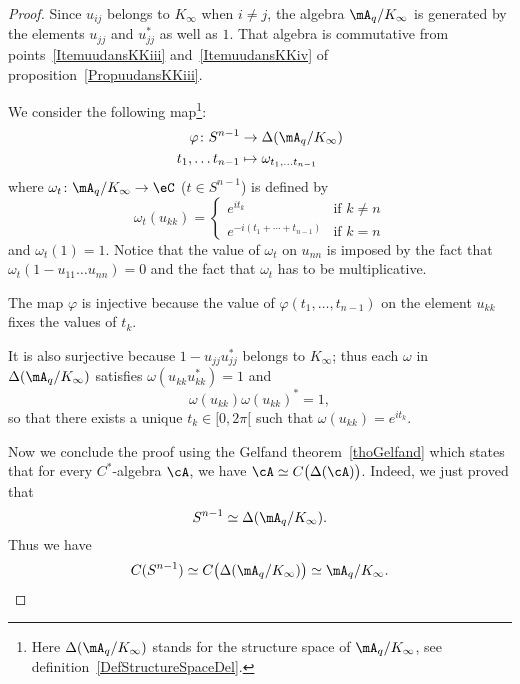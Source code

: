 \begin{proof}
	Since $u_{ij}$ belongs to $K_{\infty}$ when $i\neq j$, the algebra $\mA_q/K_{\infty}$ is generated by the elements $u_{jj}$ and $u_{jj}^*$ as well as $1$. That algebra is commutative from points~\ref{ItemuudansKKiii} and~\ref{ItemuudansKKiv} of proposition~\ref{PropuudansKKiii}.

	We consider the following map\footnote{Here $\Delta(\mA_q/K_{\infty})$ stands for the structure space of $\mA_q/K_{\infty}$, see definition~\ref{DefStructureSpaceDel}.}:
	\begin{equation}
		\begin{aligned}
			\varphi\colon S^{n-1} & \to \Delta(\mA_q/K_{\infty})        \\
			t_1,\ldots t_{n-1}    & \mapsto \omega_{t_1,\ldots t_{n-1}}
		\end{aligned}
	\end{equation}
	where $\omega_t\colon \mA_q/K_{\infty}\to \eC$ ($t\in S^{n-1}$) is defined by
	\begin{equation}
		\omega_t(u_{kk})=\begin{cases}
			e^{it_k}                   & \text{if }k\neq n \\
			e^{-i(t_1+\cdots+t_{n-1})} & \text{if }k=n
		\end{cases}
	\end{equation}
	and $\omega_t(1)=1$. Notice that the value of $\omega_t$ on $u_{nn}$ is imposed by the fact that $\omega_t(1-u_{11}\ldots u_{nn})=0$ and the fact that $\omega_t$ has to be multiplicative.

	The map $\varphi$ is injective because the value of $\varphi(t_1,\ldots,t_{n-1})$ on the element $u_{kk}$ fixes the values of $t_k$.

	It is also surjective because $1-u_{jj}u_{jj}^*$ belongs to $K_{\infty}$; thus each $\omega$ in $\Delta(\mA_q/K_{\infty})$ satisfies $\omega(u_{kk}u_{kk}^*)=1$ and
	\begin{equation}
		\omega(u_{kk})\omega(u_{kk})^*=1,
	\end{equation}
	so that there exists a unique $t_k\in\mathopen[ 0 , 2\pi [$ such that $\omega(u_{kk})= e^{it_k}$.

	Now we conclude the proof using the Gelfand theorem~\ref{thoGelfand} which states that for every $C^*$-algebra $\cA$, we have $\cA\simeq C\big( \Delta(\cA) \big)$. Indeed, we just proved that
	\begin{equation}
		S^{n-1}\simeq\Delta(\mA_q/K_{\infty}).
	\end{equation}
	Thus we have
	\begin{equation}
		C(S^{n-1})\simeq C\big( \Delta(\mA_q/K_{\infty}) \big)\simeq\mA_q/K_{\infty}.
	\end{equation}
\end{proof}

